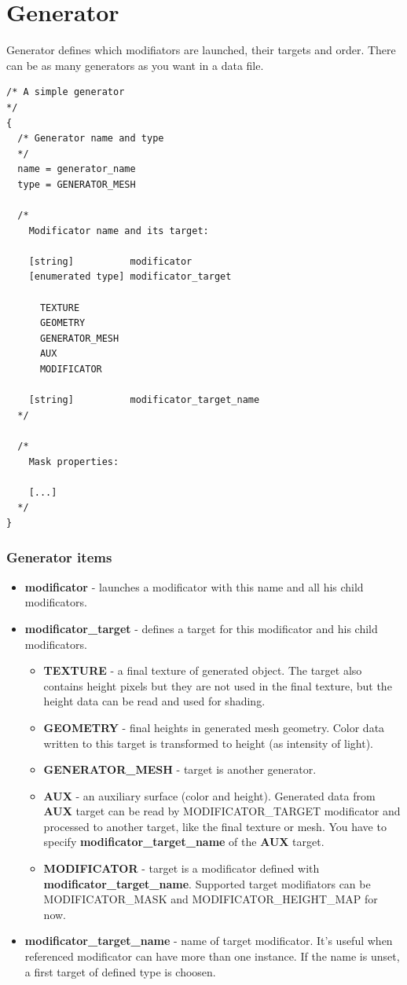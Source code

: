 \documentclass[9pt]{article}
\begin{document}
\newpage
\section{Generator}

Generator defines which modifiators are launched, their targets and order.
There can be as many generators as you want in a data file.

\begin{verbatim}
/* A simple generator
*/
{
  /* Generator name and type
  */
  name = generator_name
  type = GENERATOR_MESH

  /*
    Modificator name and its target:
    
    [string]          modificator
    [enumerated type] modificator_target
      
      TEXTURE
      GEOMETRY
      GENERATOR_MESH
      AUX
      MODIFICATOR
      
    [string]          modificator_target_name
  */
  
  /*
    Mask properties:
    
    [...]  
  */
}
\end{verbatim}
\subsubsection*{Generator items}
\begin{itemize}
\item{\bf modificator} - launches a modificator with this name and all his child modificators.
\item{\bf modificator\_target} - defines a target for this modificator and his child modificators.
\begin{itemize}
\item{\bf TEXTURE} - a final texture of generated object. The target also contains height pixels
but they are not used in the final texture, but the height data can be read and used for shading.
\item{\bf GEOMETRY} - final heights in generated mesh geometry. Color data written to this target
is transformed to height (as intensity of light).
\item{\bf GENERATOR\_MESH} - target is another generator.
\item{\bf AUX} - an auxiliary surface (color and height). Generated data from {\bf AUX} target 
can be read by MODIFICATOR\_TARGET modificator and processed to another target, like the final texture or mesh. 
You have to specify {\bf modificator\_target\_name} of the {\bf AUX} target.
\item{\bf MODIFICATOR} - target is a modificator defined with {\bf modificator\_target\_name}. 
Supported target modifiators can be MODIFICATOR\_MASK and 
MODIFICATOR\_HEIGHT\_MAP for now.
\end{itemize}
\item{\bf modificator\_target\_name} - name of target modificator. It's useful
when referenced modificator can have more than one instance. If the name is unset,
a first target of defined type is choosen.
\end{itemize}
\end{document}
